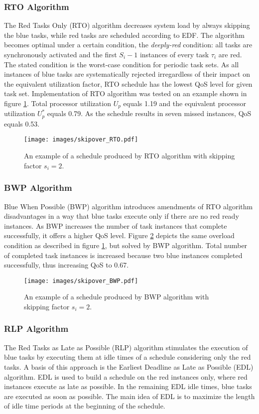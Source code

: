 \subsubsection{RTO Algorithm}
The Red Tasks Only (RTO) algorithm decreases system load by always skipping the blue tasks, while red tasks are scheduled according to EDF. 
The algorithm becomes optimal under a certain condition, the \textit{deeply-red} condition:
all tasks are synchronously activated and the first \(S_i - 1\) instances of every task $\tau_i$ are red. 
The stated condition is the worst-case condition for periodic task sets.
As all instances of blue tasks are systematically rejected irregardless of their impact on the equivalent utilization factor, RTO schedule has the lowest QoS level for given task set.
Implementation of RTO algorithm was tested on an example shown in 
figure \ref{rto}.
Total processor utilization $U_p$ equals 1.19 and the equivalent processor 
utilization $U_p^\ast$ equals 0.79.
As the schedule results in seven missed instances, QoS equals 0.53. 
\\
\begin{figure}[ht]
    \centering
    \texttt{[image: images/skipover\_RTO.pdf]}
    \caption{An example of a schedule produced by RTO algorithm with skipping factor $s_i=2$.}
    \label{rto}
\end{figure}

\subsubsection{BWP Algorithm}
Blue When Possible (BWP) algorithm introduces amendments of RTO algorithm disadvantages in a way that blue tasks execute only if there are no red ready instances.
As BWP increases the number of task instances that complete successfully, it offers a higher QoS level. 
Figure \ref{bwp} depicts the same overload condition as described in figure 
\ref{rto}, but solved by BWP algorithm. 
Total number of completed task instances is increased because two blue instances completed successfully, thus increasing QoS to 0.67.
\\
\begin{figure}[ht]
    \centering
    \texttt{[image: images/skipover\_BWP.pdf]}
    \caption{An example of a schedule produced by BWP algorithm with skipping factor $s_i=2$.}
    \label{bwp}
\end{figure}

\subsubsection{RLP Algorithm}
The Red Tasks as Late as Possible (RLP) algorithm stimulates the execution of blue tasks by executing them at idle times of a schedule considering only the red tasks. 
A basis of this approach is the Earliest Deadline as Late as Possible (EDL) algorithm. 
EDL is used to build a schedule on the red instances only, where red instances execute as late as possible. 
In the remaining EDL idle times, blue tasks are executed as soon as possible. 
The main idea of EDL is to maximize the length of idle time periods at the beginning of the schedule. 

